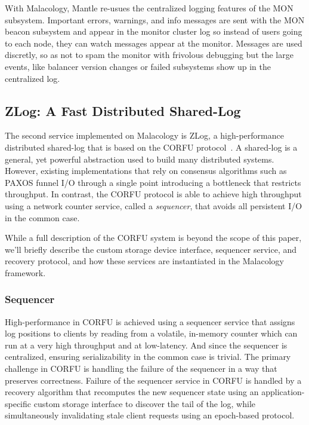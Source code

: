 \documentclass[10pt,twocolumn]{article}
\begin{document}
With Malacology, Mantle re-usues the centralized logging features of the MON
subsystem. Important errors, warnings, and info messages are sent with the MON
beacon subsystem and appear in the monitor cluster log so instead of users
going to each node, they can watch messages appear at the monitor. Messages are
used discretly, so as not to spam the monitor with frivolous debugging but the
large events, like balancer version changes or failed subsystems show up in the
centralized log.

\subsection{ZLog: A Fast Distributed Shared-Log}
\label{sec:zlog}

The second service implemented on Malacology is ZLog, a high-performance
distributed shared-log that is based on the CORFU
protocol~\cite{balakrishnan_corfu_2012}. A
shared-log is a general, yet powerful abstraction used to build many
distributed systems. However, existing implementations that rely on consensus
algorithms such as PAXOS funnel I/O through a single point introducing a
bottleneck that restricts throughput. In contrast, the CORFU protocol is able
to achieve high throughput using a network counter service, called a 
\emph{sequencer}, that avoids all persistent I/O in the common case.

While a full description of the CORFU system is beyond the scope of this
paper, we'll briefly describe the custom storage device interface, sequencer
service, and recovery protocol, and how these services are instantiated in the
Malacology framework.

\subsubsection{Sequencer}

High-performance in CORFU is achieved using a sequencer service that assigns
log positions to clients by reading from a volatile, in-memory counter which
can run at a very high throughput and at low-latency. And since the sequencer
is centralized, ensuring serializability in the common case is trivial.  The
primary challenge in CORFU is handling the failure of the sequencer in a way
that preserves correctness. Failure of the sequencer service in CORFU is
handled by a recovery algorithm that recomputes the new sequencer state using
an application-specific custom storage interface to discover the tail of the
log, while simultaneously invalidating stale client requests using an
epoch-based protocol.
\end{document}
